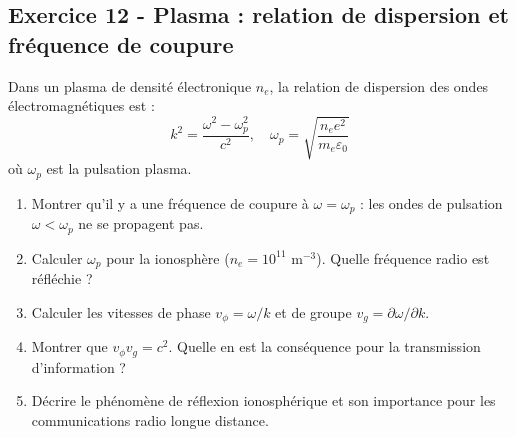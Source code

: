\documentclass[12pt,a4paper]{article}
\begin{document}
\subsection*{Exercice 12 - Plasma : relation de dispersion et fréquence de coupure \niveau{\difficile}}

\begin{boiteexercice}
Dans un plasma de densité électronique $n_e$, la relation de dispersion des ondes électromagnétiques est :
\[
k^2 = \frac{\omega^2 - \omega_p^2}{c^2}, \quad \omega_p = \sqrt{\frac{n_e e^2}{m_e\varepsilon_0}}
\]
où $\omega_p$ est la pulsation plasma.
\begin{enumerate}
  \item Montrer qu'il y a une fréquence de coupure à $\omega = \omega_p$ : les ondes de pulsation $\omega < \omega_p$ ne se propagent pas.
  \item Calculer $\omega_p$ pour la ionosphère ($n_e = 10^{11}$ m$^{-3}$). Quelle fréquence radio est réfléchie ?
  \item Calculer les vitesses de phase $v_\phi = \omega/k$ et de groupe $v_g = \partial\omega/\partial k$.
  \item Montrer que $v_\phi v_g = c^2$. Quelle en est la conséquence pour la transmission d'information ?
  \item Décrire le phénomène de réflexion ionosphérique et son importance pour les communications radio longue distance.
\end{enumerate}
\end{boiteexercice}
\end{document}
